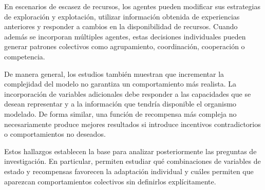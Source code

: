\documentclass[conference]{IEEEtran}
\begin{document}
En escenarios de escasez de recursos, los agentes pueden modificar sus
estrategias de exploración y explotación, utilizar información obtenida
de experiencias anteriores y responder a cambios en la disponibilidad de
recursos. Cuando además se incorporan múltiples agentes, estas decisiones
individuales pueden generar patrones colectivos como agrupamiento,
coordinación, cooperación o competencia.

De manera general, los estudios también muestran que incrementar la
complejidad del modelo no garantiza un comportamiento más realista. La
incorporación de variables adicionales debe responder a las capacidades
que se desean representar y a la información que tendría disponible el
organismo modelado. De forma similar, una función de recompensa más
compleja no necesariamente produce mejores resultados si introduce
incentivos contradictorios o comportamientos no deseados.

Estos hallazgos establecen la base para analizar posteriormente las
preguntas de investigación. En particular, permiten estudiar qué
combinaciones de variables de estado y recompensas favorecen la
adaptación individual y cuáles permiten que aparezcan comportamientos
colectivos sin definirlos explícitamente.
\end{document}
